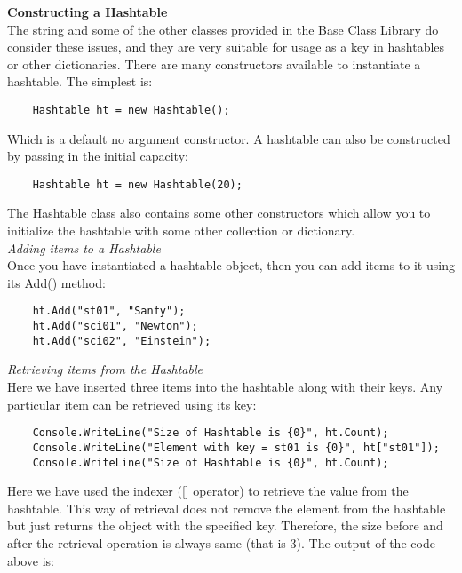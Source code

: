 \textbf{Constructing a Hashtable}\\

The string and some of the other classes provided in the Base Class Library do consider these issues, and they are
very suitable for usage as a key in hashtables or other dictionaries. There are many constructors available to
instantiate a hashtable. The simplest is:

\begin{lstlisting}
    Hashtable ht = new Hashtable();    
\end{lstlisting}

Which is a default no argument constructor. A hashtable can also be constructed by passing in the initial capacity:

\begin{lstlisting}
    Hashtable ht = new Hashtable(20);    
\end{lstlisting}

The Hashtable class also contains some other constructors which allow you to initialize the hashtable with some
other collection or dictionary.\\

\emph{Adding items to a Hashtable}\\

Once you have instantiated a hashtable object, then you can add items to it using its Add() method:

\begin{lstlisting}
    ht.Add("st01", "Sanfy");
    ht.Add("sci01", "Newton");
    ht.Add("sci02", "Einstein");    
\end{lstlisting}

\emph{Retrieving items from the Hashtable}\\

Here we have inserted three items into the hashtable along with their keys. Any particular item can be retrieved
using its key:

\begin{lstlisting}
    Console.WriteLine("Size of Hashtable is {0}", ht.Count);
    Console.WriteLine("Element with key = st01 is {0}", ht["st01"]);
    Console.WriteLine("Size of Hashtable is {0}", ht.Count);    
\end{lstlisting}

Here we have used the indexer ([] operator) to retrieve the value from the hashtable. This way of retrieval does not
remove the element from the hashtable but just returns the object with the specified key. Therefore, the size before
and after the retrieval operation is always same (that is 3). The output of the code above is:

